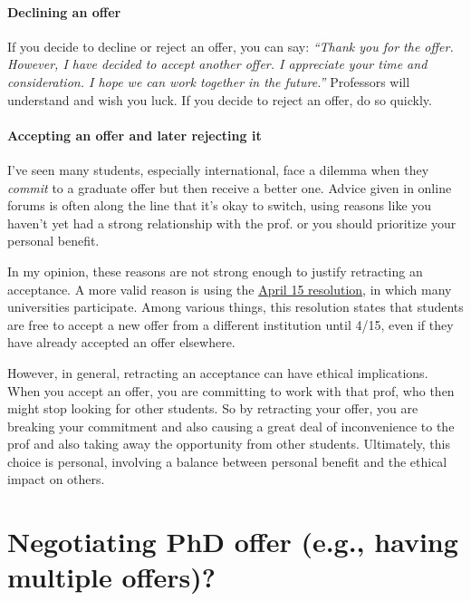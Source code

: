 \documentclass[oneside,11pt,dvipsnames]{book}
\def\sectioninfo#1{%
  \addcontentsline{toc}{sectioninfo}{%
    \noexpand\numberline{}\color{black}{#1}}%
}
\begin{document}
\paragraph{Declining an offer} If you decide to decline or reject an offer, you can say: \emph{``Thank you for the offer. However, I have decided to accept another offer.  I appreciate your time and consideration.  I hope we can work together in the future.''}  Professors will understand and wish you luck.  If you decide to reject an offer, do so quickly.


\paragraph{Accepting an offer and later rejecting it}

I've seen many students, especially international, face a dilemma when they \emph{commit} to a graduate offer but then receive a better one. Advice given in online forums is often along the line that it's okay to switch, using reasons like you haven't yet had a strong relationship with the prof. or you should prioritize your personal benefit.

In my opinion, these reasons are not strong enough to justify retracting an acceptance. A more valid reason is using the \href{https://cgsnet.org/wp-content/uploads/2024/01/CGS_April15_Resolution_Jan312024.pdf}{April 15 resolution}, in which many universities participate. Among various things, this resolution states that students are free to accept a new offer from a different institution until 4/15, even if they have already accepted an offer elsewhere. 

However, in general, retracting an acceptance can have ethical implications. When you accept an offer, you are committing to work with that prof, who then might stop looking for other students. So by retracting your offer, you are breaking your commitment and also causing a great deal of inconvenience to the prof and also taking away the opportunity from other students. 
Ultimately, this choice is personal, involving a balance between personal benefit and the ethical impact on others. 

\section{Negotiating PhD offer (e.g., having multiple offers)?}\label{sec:negotiate}
\sectioninfo{You will not be able to negotiate stipend, but you can ask for specific start date, TA assignment, and conference travel budget.}
\end{document}
